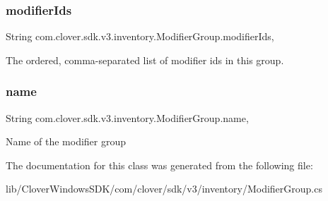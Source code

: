 \subsubsection{\texorpdfstring{modifier\+Ids}{modifierIds}}
{\footnotesize\ttfamily String com.\+clover.\+sdk.\+v3.\+inventory.\+Modifier\+Group.\+modifier\+Ids\hspace{0.3cm}{\ttfamily [get]}, {\ttfamily [set]}}



The ordered, comma-\/separated list of modifier ids in this group. 

\mbox{\label{classcom_1_1clover_1_1sdk_1_1v3_1_1inventory_1_1_modifier_group_ac8ccb2e4d8bc23bbd6d8fd2336951c26}} 
\subsubsection{\texorpdfstring{name}{name}}
{\footnotesize\ttfamily String com.\+clover.\+sdk.\+v3.\+inventory.\+Modifier\+Group.\+name\hspace{0.3cm}{\ttfamily [get]}, {\ttfamily [set]}}



Name of the modifier group 



The documentation for this class was generated from the following file\+:\begin{DoxyCompactItemize}
\item 
lib/\+Clover\+Windows\+S\+D\+K/com/clover/sdk/v3/inventory/Modifier\+Group.\+cs\end{DoxyCompactItemize}
